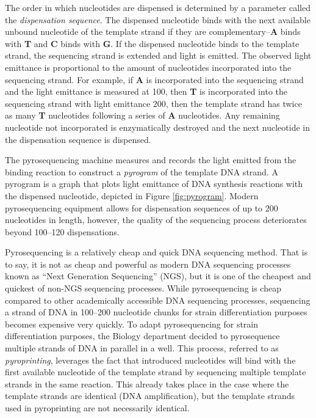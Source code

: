 \documentclass[12pt]{ucthesis}
\begin{document}
      The order in which nucleotides are dispensed is determined by
      a parameter called the \textit{dispensation sequence}. The dispensed
      nucleotide binds with the next available unbound nucleotide of the
      template strand if they are complementary--\textbf{A} binds with
      \textbf{T} and \textbf{C} binds with \textbf{G}. If the dispensed
      nucleotide binds to the template strand, the sequencing strand is
      extended and light is emitted. The observed light emittance is
      proportional to the amount of nucleotides incorporated into the
      sequencing strand. For example, if \textbf{A} is incorporated into the
      sequencing strand and the light emittance is measured at 100, then
      \textbf{T} is incorporated into the sequencing strand with light
      emittance 200, then the template strand has twice as many \textbf{T}
      nucleotides following a series of \textbf{A} nucleotides. Any remaining
      nucleotide not incorporated is enzymatically destroyed and the next
      nucleotide in the dispensation sequence is dispensed.
      
      The pyrosequencing machine measures and records the light emitted from
      the binding reaction to construct a \textit{pyrogram} of the template DNA
      strand. A pyrogram is a graph that plots light emittance of DNA synthesis
      reactions with the dispensed nucleotide, depicted in Figure
      \ref{fig:pyrogram}. Modern pyrosequencing equipment allows for
      dispensation sequences of up to 200 nucleotides in length, however, the
      quality of the sequencing process deteriorates beyond 100--120
      dispensations.

      Pyrosequencing is a relatively cheap and quick DNA sequencing method.
      That is to say, it is not as cheap and powerful as modern DNA sequencing
      processes known as ``Next Generation Sequencing'' (NGS), but it is one of
      the cheapest and quickest of non-NGS sequencing processes. While
      pyrosequencing is cheap compared to other academically accessible DNA
      sequencing processes, sequencing a strand of DNA in 100--200 nucleotide
      chunks for strain differentiation purposes becomes expensive very
      quickly. To adapt pyrosequencing for strain differentiation purposes, the
      Biology department decided to pyrosequence multiple strands of DNA in
      parallel in a well. This process, referred to as \textit{pyroprinting},
      leverages the fact that introduced nucleotides will bind with the first
      available nucleotide of the template strand by sequencing multiple
      template strands in the same reaction. This already takes place in the
      case where the template strands are identical (DNA amplification), but
      the template strands used in pyroprinting are not necessarily identical.
\end{document}
